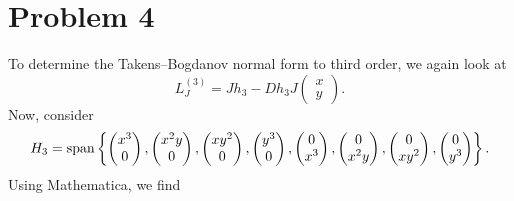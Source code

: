 \documentclass{article}
\begin{document}
\section{Problem 4}
To determine the Takens--Bogdanov normal form to third order, we again look at
\[
L^{(3)}_J=Jh_3-Dh_3J\begin{pmatrix}
	x\\y
\end{pmatrix}.
\]
Now, consider 
\[
H_3=\operatorname{span}\left\{\begin{pmatrix}
	x^3\\0
\end{pmatrix},\begin{pmatrix}
x^2y\\0
\end{pmatrix},\begin{pmatrix}
xy^2\\0
\end{pmatrix},\begin{pmatrix}
y^3\\0
\end{pmatrix},\begin{pmatrix}
0\\x^3
\end{pmatrix},\begin{pmatrix}
0\\x^2y
\end{pmatrix},\begin{pmatrix}
0\\xy^2
\end{pmatrix},\begin{pmatrix}
0\\y^3
\end{pmatrix}\right\}.
\]
Using Mathematica, we find
\end{document}
